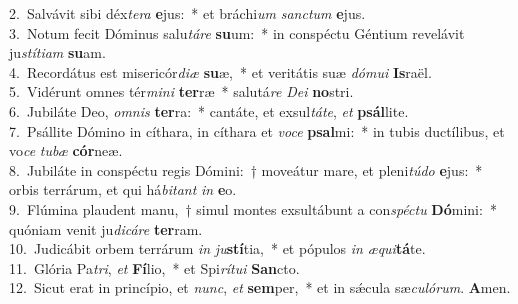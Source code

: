 {2.~}Salvávit sibi déx\textit{te}\textit{ra} \textbf{e}jus:~* et bráchi\textit{um} \textit{san}\textit{ctum} \textbf{e}jus.\\
{3.~}Notum fecit Dóminus salu\textit{tá}\textit{re} \textbf{su}um:~* in conspéctu Géntium revelávit ju\textit{stí}\textit{ti}\textit{am} \textbf{su}am.\\
{4.~}Recordátus est misericór\textit{di}\textit{æ} \textbf{su}æ,~* et veritátis suæ \textit{dó}\textit{mu}\textit{i} \textbf{Is}raël.\\
{5.~}Vidérunt omnes tér\textit{mi}\textit{ni} \textbf{ter}ræ~* salutá\textit{re} \textit{De}\textit{i} \textbf{no}stri.\\
{6.~}Jubiláte Deo, \textit{om}\textit{nis} \textbf{ter}ra:~* cantáte, et exsul\textit{tá}\textit{te}, \textit{et} \textbf{psál}lite.\\
{7.~}Psállite Dómino in cíthara, in cíthara et \textit{vo}\textit{ce} \textbf{psal}mi:~* in tubis ductílibus, et vo\textit{ce} \textit{tu}\textit{bæ} \textbf{cór}neæ.\\
{8.~}Jubiláte in conspéctu regis Dómini:~† moveátur mare, et pleni\textit{tú}\textit{do} \textbf{e}jus:~* orbis terrárum, et qui há\textit{bi}\textit{tant} \textit{in} \textbf{e}o.\\
{9.~}Flúmina plaudent manu,~† simul montes exsultábunt a con\textit{spé}\textit{ctu} \textbf{Dó}mini:~* quóniam venit ju\textit{di}\textit{cá}\textit{re} \textbf{ter}ram.\\
{10.~}Judicábit orbem terrárum \textit{in} \textit{ju}\textbf{stí}tia,~* et pópulos \textit{in} \textit{æ}\textit{qui}\textbf{tá}te.\\
{11.~}Glória Pa\textit{tri}, \textit{et} \textbf{Fí}lio,~* et Spi\textit{rí}\textit{tu}\textit{i} \textbf{San}cto.\\
{12.~}Sicut erat in princípio, et \textit{nunc}, \textit{et} \textbf{sem}per,~* et in sǽcula sæ\textit{cu}\textit{ló}\textit{rum}. \textbf{A}men.\\
